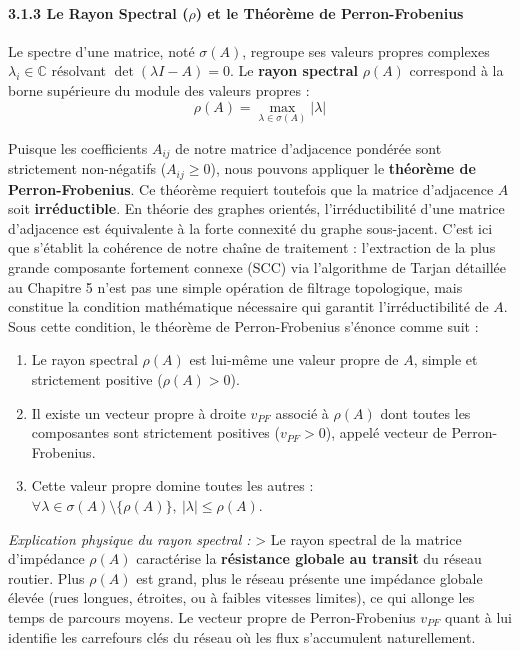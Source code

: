 \documentclass[10pt, a4paper]{article}
\providecommand{\tightlist}{}
\begin{document}
\paragraph{\texorpdfstring{3.1.3 Le Rayon Spectral (\(\rho\)) et le
Théorème de
Perron-Frobenius}{3.1.3 Le Rayon Spectral (\textbackslash rho) et le Théorème de Perron-Frobenius}}\label{le-rayon-spectral-rho-et-le-thuxe9oruxe8me-de-perron-frobenius}

Le spectre d'une matrice, noté \(\sigma(A)\), regroupe ses valeurs
propres complexes \(\lambda_i \in \mathbb{C}\) résolvant
\(\det(\lambda I - A) = 0\). Le \textbf{rayon spectral} \(\rho(A)\)
correspond à la borne supérieure du module des valeurs propres :
\[\rho(A) = \max_{\lambda \in \sigma(A)} |\lambda|\]

Puisque les coefficients \(A_{ij}\) de notre matrice d'adjacence
pondérée sont strictement non-négatifs (\(A_{ij} \ge 0\)), nous pouvons
appliquer le \textbf{théorème de Perron-Frobenius}. Ce théorème requiert
toutefois que la matrice d'adjacence \(A\) soit \textbf{irréductible}.
En théorie des graphes orientés, l'irréductibilité d'une matrice
d'adjacence est équivalente à la forte connexité du graphe sous-jacent.
C'est ici que s'établit la cohérence de notre chaîne de traitement :
l'extraction de la plus grande composante fortement connexe (SCC) via
l'algorithme de Tarjan détaillée au Chapitre 5 n'est pas une simple
opération de filtrage topologique, mais constitue la condition
mathématique nécessaire qui garantit l'irréductibilité de \(A\). Sous
cette condition, le théorème de Perron-Frobenius s'énonce comme suit :

\begin{enumerate}
\def\labelenumi{\arabic{enumi}.}
\tightlist
\item
  Le rayon spectral \(\rho(A)\) est lui-même une valeur propre de \(A\),
  simple et strictement positive (\(\rho(A) > 0\)).
\item
  Il existe un vecteur propre à droite \(v_{PF}\) associé à \(\rho(A)\)
  dont toutes les composantes sont strictement positives
  (\(v_{PF} > 0\)), appelé vecteur de Perron-Frobenius.
\item
  Cette valeur propre domine toutes les autres :
  \(\forall \lambda \in \sigma(A) \setminus \{\rho(A)\}, \ |\lambda| \le \rho(A)\).
\end{enumerate}

\emph{Explication physique du rayon spectral :} \textgreater{} Le rayon
spectral de la matrice d'impédance \(\rho(A)\) caractérise la
\textbf{résistance globale au transit} du réseau routier. Plus
\(\rho(A)\) est grand, plus le réseau présente une impédance globale
élevée (rues longues, étroites, ou à faibles vitesses limites), ce qui
allonge les temps de parcours moyens. Le vecteur propre de
Perron-Frobenius \(v_{PF}\) quant à lui identifie les carrefours clés du
réseau où les flux s'accumulent naturellement.
\end{document}
